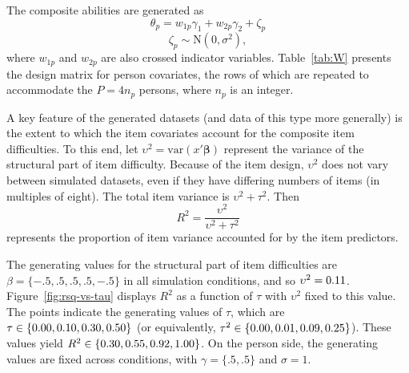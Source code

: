 \documentclass[12pt, letterpaper]{article}
\begin{document}


The composite abilities are generated as
\begin{equation} \label{eq:theta}
	\theta_p = w_{1p}\gamma_1 + w_{2p}\gamma_2  + \zeta_p
\end{equation}
\begin{equation} \label{eq:zeta}
	\zeta_p \sim \mathrm{N}(0, \sigma^2)
,\end{equation}
where $w_{1p}$ and $w_{2p}$ are also crossed indicator variables. Table~\ref{tab:W} presents the design matrix for person covariates, the rows of which are repeated to accommodate the $P = 4n_p$ persons, where $n_p$ is an integer.



A key feature of the generated datasets (and data of this type more generally) is the extent to which the item covariates account for the composite item difficulties. To this end, let $\upsilon^2 = \mathrm{var}(x'\mathbf{\beta})$ represent the variance of the structural part of item difficulty. Because of the item design, $\upsilon^2$ does not vary between simulated datasets, even if they have differing numbers of items (in multiples of eight). The total item variance is $\upsilon^2 + \tau^2$. Then
\begin{equation}
R^2 = \frac{\upsilon^2}{\upsilon^2 + \tau^2}
\end{equation}
represents the proportion of item variance accounted for by the item predictors. 

The generating values for the structural part of item difficulties are $\beta = \{ -.5, .5, .5, .5, -.5 \}$ in all simulation conditions, and so $\upsilon^2 = 0.11$. Figure~\ref{fig:rsq-vs-tau} displays $R^2$ as a function of $\tau$ with $\upsilon^2$ fixed to this value. The points indicate the generating values of $\tau$, which are $\tau \in \{0.00, 0.10, 0.30, {} 0.50\}$ (or equivalently,  $\tau^2 \in \{0.00, 0.01, 0.09, {} 0.25\}$). These values yield $R^2 \in \{0.30, 0.55, 0.92, {} 1.00\}$. On the person side, the generating values are fixed across conditions, with $\gamma = \{ .5, .5 \}$ and $\sigma = 1$. 
\end{document}
